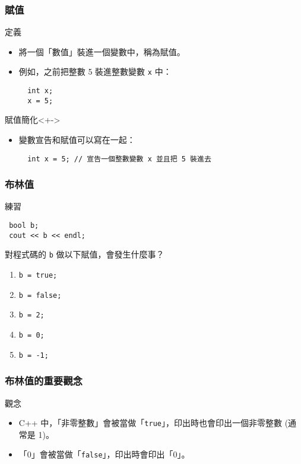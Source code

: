 \documentclass[utf8]{beamer}
\begin{document}
\begin{CJK}{UTF8}{bkai}
\begin{frame}[fragile]
  \frametitle{賦值}
  \begin{block}{定義}
    \begin{itemize}[<+->]
    \item 將一個「數值」裝進一個變數中，稱為\alert{賦值}。
    \item 例如，之前把整數 5 裝進整數變數 \lstinline{x}{} 中：
      \begin{lstlisting}
  int x;
  x = 5;
      \end{lstlisting}
    \end{itemize}
  \end{block}
  \begin{exampleblock}{賦值簡化}<+->
    \begin{itemize}
    \item 變數宣告和賦值可以寫在一起：
      \begin{lstlisting}
  int x = 5; // 宣告一個整數變數 x 並且把 5 裝進去
      \end{lstlisting}
    \end{itemize}
  \end{exampleblock}
\end{frame}

\begin{frame}[fragile]
  \frametitle{布林值}
  \begin{block}{練習}
    \begin{lstlisting}
 bool b;
 cout << b << endl;
    \end{lstlisting}
    對程式碼的 \lstinline{b}{} 做以下賦值，會發生什麼事？
    \begin{enumerate}
    \item<2-> \lstinline{b = true;}{}
    \item<3-> \lstinline{b = false;}{}
    \item<4-> \lstinline{b = 2;}{}
    \item<5-> \lstinline{b = 0;}{}
    \item<6-> \lstinline{b = -1;}{}
    \end{enumerate}
  \end{block}
\end{frame}

\begin{frame}[fragile]
  \frametitle{布林值的重要觀念}
  \begin{alertblock}{觀念}
    \begin{itemize}
    \item C++ 中，「\alert{非零整數}」會被當做「\lstinline{true}{}」，印出時也會印出一個非零整數 (\alert{通常是 1})。
    \item<2-> 「0」會被當做「\lstinline{false}{}」，印出時會印出「\alert{0}」。
    \end{itemize}
  \end{alertblock}
\end{frame}


\end{CJK}
\end{document}

